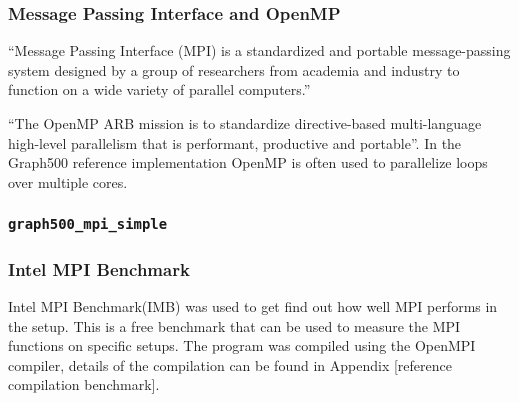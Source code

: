 \subsubsection{Message Passing Interface and OpenMP}
``Message Passing Interface (MPI) is a standardized and portable message-passing system designed by a group of researchers from academia and industry to function on a wide variety of parallel computers.\cite{mpi}''


``The OpenMP ARB mission is to standardize directive-based multi-language high-level parallelism that is performant, productive and portable''\cite{openmp}. In the Graph500 reference implementation OpenMP is often used to parallelize loops over multiple cores. 

\subsubsection{\texttt{graph500\_mpi\_simple}}

\subsubsection{Intel MPI Benchmark}
Intel MPI Benchmark(IMB) was used to get find out how well MPI performs in the setup. This is a free benchmark that can be used to measure the MPI functions on specific setups. The program was compiled using the OpenMPI compiler, details of the compilation can be found in Appendix [reference compilation benchmark].


